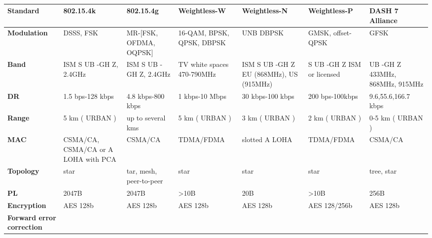 \begin{table}[h!]
\scriptsize
	\begin{tabulary}{\textwidth}{L|L|L|L|L|L|L}
	\textbf{Standard}                 & \textbf{802.15.4k}                  & \textbf{802.15.4g}      & \textbf{Weightless-W}      & \textbf{Weightless-N}                   & \textbf{Weightless-P}      & \textbf{DASH 7 Alliance}\\\hline
	\textbf{Modulation}               & DSSS, FSK                           & MR-[FSK, OFDMA, OQPSK]  & 16-QAM, BPSK, QPSK, DBPSK  & UNB DBPSK                               & GMSK, offset-QPSK          & GFSK\\\hline
	\textbf{Band}                     & ISM S UB -GH Z, 2.4GHz              & ISM S UB -GH Z, 2.4GHz  & TV white spaces 470-790MHz & ISM S UB -GH Z EU (868MHz), US (915MHz) & S UB -GH Z ISM or licensed & UB -GH Z 433MHz, 868MHz, 915MHz\\\hline
	\textbf{\ac{DR}}                & 1.5 bps-128 kbps                    & 4.8 kbps-800 kbps       & 1 kbps-10 Mbps             & 30 kbps-100 kbps                        & 200 bps-100kbps            & 9.6,55.6,166.7 kbps\\\hline
	\textbf{Range}                    & 5 km ( URBAN )                      & up to several kms       & 5 km ( URBAN )             & 3 km ( URBAN )                          & 2 km ( URBAN )             & 0-5 km ( URBAN )\\\hline
	\textbf{MAC}                      & CSMA/CA, CSMA/CA or A LOHA with PCA & CSMA/CA                 & TDMA/FDMA                  & slotted A LOHA                          & TDMA/FDMA                  & CSMA/CA \\\hline
	\textbf{Topology}                 & star                                & tar, mesh, peer-to-peer & star                       & star                                    & star                       & tree, star\\\hline
	\textbf{\ac{PL}}           & 2047B                               & 2047B                   & >10B                       & 20B                                     & >10B                       & 256B \\\hline
	\textbf{Encryption}               & AES 128b                            & AES 128b                & AES 128b                   & AES 128b                                & AES 128/256b               & AES 128b \\\hline
	\textbf{Forward error correction} & \ok                                 & \ok                     & \ok                        & \ko                                     & \ok                        & \ok\\\hline
	\end{tabulary}
\caption{\label{tab:uyuy} \cite{raza_low_22a}}
\end{table}

